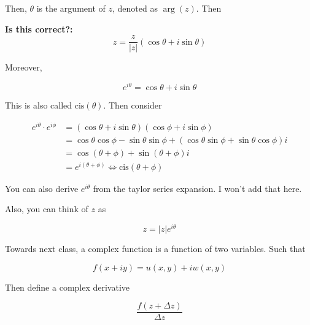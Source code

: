 \documentclass{article}
\newtheorem{one minute paper}[theorem]{One Minute Paper}
\begin{document}
Then, $\theta$ is the argument of $z$, denoted as $\arg(z)$. Then 

\textbf{Is this correct?:}
\begin{equation}
    z = \frac{z}{|z|}(\cos\theta + i\sin\theta)
\end{equation}

Moreover, 

\begin{equation}
    e^{i\theta} = \cos\theta + i\sin\theta
\end{equation}

This is also called $\text{cis}(\theta)$. Then consider 

\begin{align}
    e^{i\theta}\cdot e^{i\phi} &= (\cos\theta + i\sin\theta)(\cos\phi + i\sin\phi)\\
    &= \cos\theta\cos\phi - \sin\theta\sin\phi + (\cos\theta\sin\phi + \sin\theta\cos\phi)i \\
    &= \cos(\theta + \phi) + \sin(\theta + \phi)i\\
    &= e^{i(\theta + \phi)} \iff \text{cis}(\theta + \phi)
\end{align}

You can also derive $e^{i\theta}$ from the taylor series expansion. I won't add that here.

Also, you can think of $z$ as 

\begin{equation}
    z = |z|e^{i\theta}
\end{equation}

Towards next class, a complex function is a function of two variables. Such that 

\begin{equation}
    f(x + iy) = u(x,y) + iw(x,y)
\end{equation}

Then define a complex derivative 

\begin{equation}
    \frac{f(z + \Delta z)}{\Delta z}
\end{equation}
\end{document}
